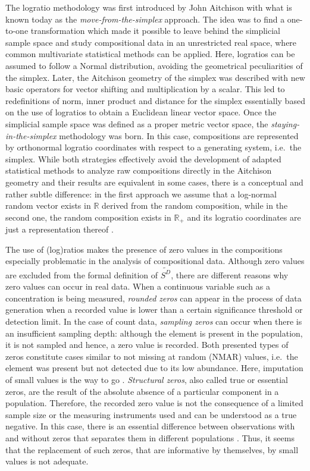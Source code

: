 \documentclass[
  openany]{book}
\begin{document}
The logratio methodology was first introduced by John Aitchison \autocite{Aitchison1982} with what is known today as the \emph{move-from-the-simplex} approach. The idea was to find a one-to-one transformation which made it possible to leave behind the simplicial sample space and study compositional data in an unrestricted real space, where common multivariate statistical methods can be applied. Here, logratios can be assumed to follow a Normal distribution, avoiding the geometrical peculiarities of the simplex. Later, the Aitchison geometry of the simplex was described with new basic operators for vector shifting and multiplication by a scalar. This led to redefinitions of norm, inner product and distance for the simplex essentially based on the use of logratios to obtain a Euclidean linear vector space. Once the simplicial sample space was defined as a proper metric vector space, the \emph{staying-in-the-simplex} methodology was born. In this case, compositions are represented by orthonormal logratio coordinates with respect to a generating system, i.e.~the simplex. While both strategies effectively avoid the development of adapted statistical methods to analyze raw compositions directly in the Aitchison geometry and their results are equivalent in some cases, there is a conceptual and rather subtle difference: in the first approach we assume that a log-normal random vector exists in \(\mathbb{R}\) derived from the random composition, while in the second one, the random composition exists in \(\mathbb{R_+}\) and its logratio coordinates are just a representation thereof \autocite{Mateu-Figueras2011}.

The use of (log)ratios makes the presence of zero values in the compositions especially problematic in the analysis of compositional data. Although zero values are excluded from the formal definition of \(\tilde{S^D}\), there are different reasons why zero values can occur in real data. When a continuous variable such as a concentration is being measured, \emph{rounded zeros} can appear in the process of data generation when a recorded value is lower than a certain significance threshold or detection limit. In the case of count data, \emph{sampling zeros} can occur when there is an insufficient sampling depth: although the element is present in the population, it is not sampled and hence, a zero value is recorded. Both presented types of zeros constitute cases similar to not missing at random (NMAR) values, i.e.~the element was present but not detected due to its low abundance. Here, imputation of small values is the way to go \autocite{Martin-Fernandez2011}. \emph{Structural zeros}, also called true or essential zeros, are the result of the absolute absence of a particular component in a population. Therefore, the recorded zero value is not the consequence of a limited sample size or the measuring instruments used and can be understood as a true negative. In this case, there is an essential difference between observations with and without zeros that separates them in different populations \autocite{Pawlowsky-Glahn2015c}. Thus, it seems that the replacement of such zeros, that are informative by themselves, by small values is not adequate.
\end{document}
